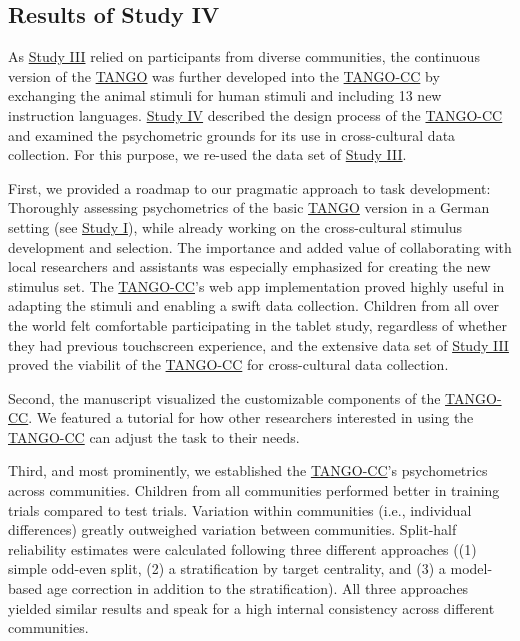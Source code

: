 \documentclass[
]{scrbook}
\begin{document}
\subsection{Results of Study IV}\label{results-studyIV}

As \hyperref[studyIII]{Study III} relied on participants from diverse communities, the continuous version of the \hyperref[acronyms_TANGO]{TANGO} was further developed into the \hyperref[acronyms_TANGO-CC]{TANGO-CC} by exchanging the animal stimuli for human stimuli and including 13 new instruction languages. \hyperref[studyIV]{Study IV} described the design process of the \hyperref[acronyms_TANGO-CC]{TANGO-CC} and examined the psychometric grounds for its use in cross-cultural data collection. For this purpose, we re-used the data set of \hyperref[studyIII]{Study III}.

First, we provided a roadmap to our pragmatic approach to task development: Thoroughly assessing psychometrics of the basic \hyperref[acronyms_TANGO]{TANGO} version in a German setting (see \hyperref[studyI]{Study I}), while already working on the cross-cultural stimulus development and selection. The importance and added value of collaborating with local researchers and assistants was especially emphasized for creating the new stimulus set. The \hyperref[acronyms_TANGO-CC]{TANGO-CC}'s web app implementation proved highly useful in adapting the stimuli and enabling a swift data collection. Children from all over the world felt comfortable participating in the tablet study, regardless of whether they had previous touchscreen experience, and the extensive data set of \hyperref[studyIII]{Study III} proved the viabilit of the \hyperref[acronyms_TANGO-CC]{TANGO-CC} for cross-cultural data collection.

Second, the manuscript visualized the customizable components of the \hyperref[acronyms_TANGO-CC]{TANGO-CC}. We featured a tutorial for how other researchers interested in using the \hyperref[acronyms_TANGO-CC]{TANGO-CC} can adjust the task to their needs.

Third, and most prominently, we established the \hyperref[acronyms_TANGO-CC]{TANGO-CC}'s psychometrics across communities. Children from all communities performed better in training trials compared to test trials. Variation within communities (i.e., individual differences) greatly outweighed variation between communities. Split-half reliability estimates were calculated following three different approaches ((1) simple odd-even split, (2) a stratification by target centrality, and (3) a model-based age correction in addition to the stratification). All three approaches yielded similar results and speak for a high internal consistency across different communities.
\end{document}
